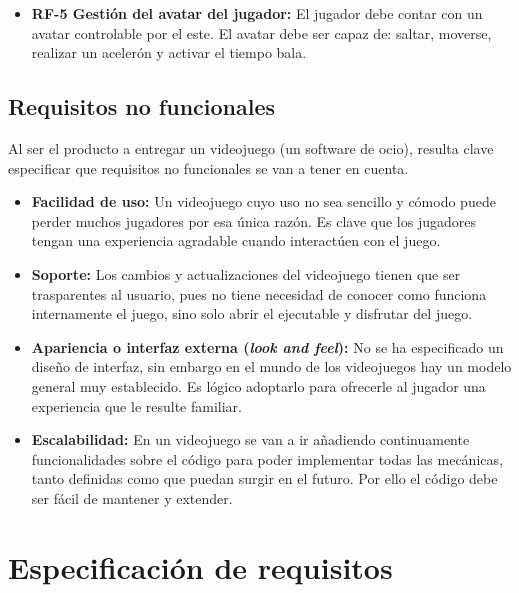 \begin{itemize}
\item
\textbf{RF-5 Gestión del avatar del jugador:} El jugador debe contar con un avatar controlable por el este. El avatar debe ser capaz de: saltar, moverse, realizar un acelerón y activar el tiempo bala.
\end{itemize}

\subsection{Requisitos no funcionales}
Al ser el producto a entregar un videojuego (un software de ocio), resulta clave especificar que requisitos no funcionales se van a tener en cuenta.

\begin{itemize}
\item
\textbf{Facilidad de uso:} Un videojuego cuyo uso no sea sencillo y cómodo puede perder muchos jugadores por esa única razón. Es clave que los jugadores tengan una experiencia agradable cuando interactúen con el juego.

\item
\textbf{Soporte:} Los cambios y actualizaciones del videojuego tienen que ser trasparentes al usuario, pues no tiene necesidad de conocer como funciona internamente el juego, sino solo abrir el ejecutable y disfrutar del juego.

\item
\textbf{Apariencia o interfaz externa (\textit{look and feel}):} No se ha especificado un diseño de interfaz, sin embargo en el mundo de los videojuegos hay un modelo general muy establecido. Es lógico adoptarlo para ofrecerle al jugador una experiencia que le resulte familiar.

\item
\textbf{Escalabilidad:} En un videojuego se van a ir añadiendo continuamente funcionalidades sobre el código para poder implementar todas las mecánicas, tanto definidas como que puedan surgir en el futuro. Por ello el código debe ser fácil de mantener y extender.
\end{itemize}


\section{Especificación de requisitos}



